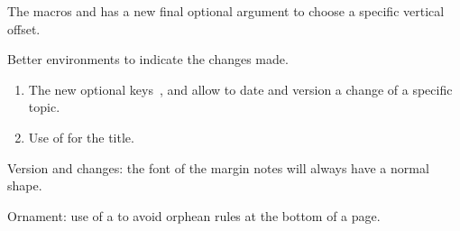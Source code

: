 \documentclass{tutodoc}
\begin{document}
\small

\begin{tdocnew}
	\item The macros  and  has a new final optional argument  to choose a specific vertical offset.

	\item Better environments to indicate the changes made.
	\begin{enumerate}
        \item The new optional keys \,,  and  allow to date and version a change of a specific topic.

        \item Use of  for the title.
	\end{enumerate}
\end{tdocnew}


\begin{tdocupdate}
	\item Version and changes: the font of the margin notes will always have a normal shape.

	\item Ornament: use of a \tdocinlatex{\cleaders} to avoid orphean rules at the bottom of a page.
\end{tdocupdate}
\end{document}
